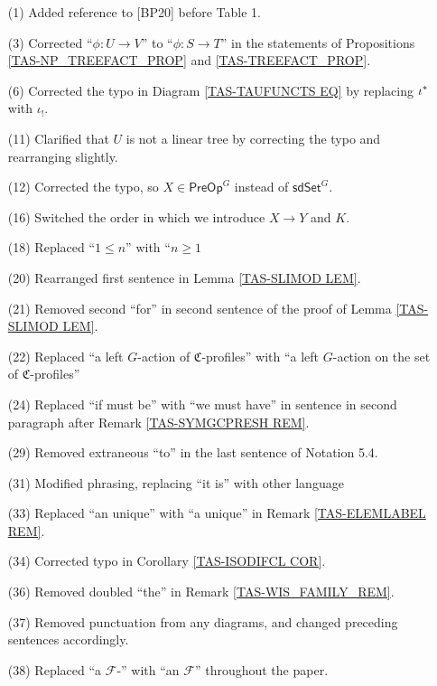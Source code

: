 \documentclass[a4paper,10pt
]{article}%
\numberwithin{equation}{section}
\numberwithin{figure}{section}
\theoremstyle{definition} %
\newcommand{\F}{\ensuremath{\mathcal F}}
\newcommand{\1}{\ensuremath{\mathbbm 1}}%
\begin{document}
\begin{enumerate}
\item[(1)] Added reference to [BP20] before Table 1.
\item[(3)] Corrected ``$\phi \colon U \to V$'' to ``$\phi \colon S \to T$'' in the statements of Propositions \ref{TAS-NP_TREEFACT_PROP} and \ref{TAS-TREEFACT_PROP}.
\item[(6)] Corrected the typo in Diagram \eqref{TAS-TAUFUNCTS EQ} by replacing $\iota^{\**}$ with $\iota_!$.
\item[(11)] Clarified that $U$ is not a linear tree by correcting the typo and rearranging slightly.
\item[(12)] Corrected the typo, so $X \in \mathsf{PreOp}^G$ instead of $\mathsf{sdSet}^G$.
\item[(16)] Switched the order in which we introduce $X \to Y$ and $K$.
\item[(18)] Replaced ``$1 \leq n$'' with ``$n \geq 1$
\item[(20)] Rearranged first sentence in Lemma \ref{TAS-SLIMOD LEM}.
\item[(21)] Removed second ``for'' in second sentence of the proof of Lemma \ref{TAS-SLIMOD LEM}.
\item[(22)] Replaced ``a left $G$-action of $\mathfrak C$-profiles'' with ``a left $G$-action on the set of $\mathfrak C$-profiles''
\item[(24)] Replaced ``if must be'' with ``we must have'' in sentence in second paragraph after Remark \ref{TAS-SYMGCPRESH REM}.
\item[(29)] Removed extraneous ``to'' in the last sentence of Notation 5.4.
\item[(31)] Modified phrasing, replacing ``it is'' with other language
\item[(33)] Replaced ``an unique'' with ``a unique'' in Remark \ref{TAS-ELEMLABEL REM}.
\item[(34)] Corrected typo in Corollary \ref{TAS-ISODIFCL COR}.
\item[(36)] Removed doubled ``the'' in Remark \ref{TAS-WIS_FAMILY_REM}.
\item[(37)] Removed punctuation from any diagrams, and changed preceding sentences accordingly.
\item[(38)] Replaced ``a $\F$-'' with ``an $\F$'' throughout the paper.
        


\end{enumerate}
\end{document}
